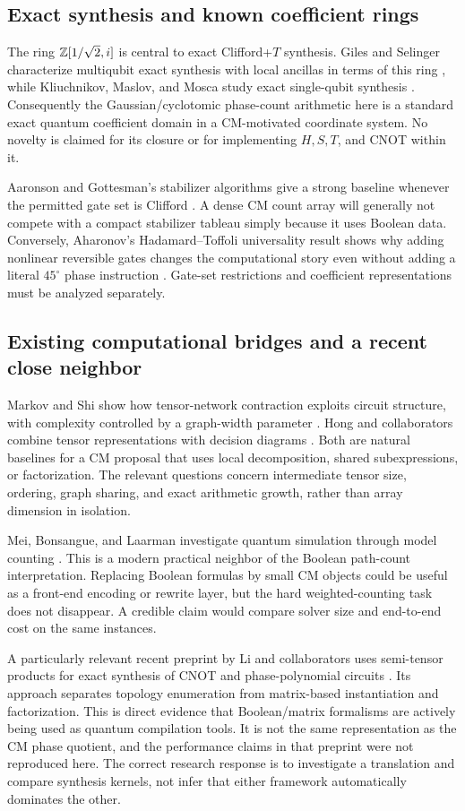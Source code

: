 \subsection{Exact synthesis and known coefficient rings}
The ring $\mathbb Z[1/\sqrt2,i]$ is central to exact Clifford+$T$ synthesis. Giles and Selinger characterize multiqubit exact synthesis with local ancillas in terms of this ring \cite{giles}, while Kliuchnikov, Maslov, and Mosca study exact single-qubit synthesis \cite{kmm}. Consequently the Gaussian/cyclotomic phase-count arithmetic here is a standard exact quantum coefficient domain in a CM-motivated coordinate system. No novelty is claimed for its closure or for implementing $H,S,T$, and CNOT within it.

Aaronson and Gottesman's stabilizer algorithms give a strong baseline whenever the permitted gate set is Clifford \cite{aaronson}. A dense CM count array will generally not compete with a compact stabilizer tableau simply because it uses Boolean data. Conversely, Aharonov's Hadamard--Toffoli universality result shows why adding nonlinear reversible gates changes the computational story even without adding a literal $45^\circ$ phase instruction \cite{aharonov}. Gate-set restrictions and coefficient representations must be analyzed separately.

\subsection{Existing computational bridges and a recent close neighbor}
Markov and Shi show how tensor-network contraction exploits circuit structure, with complexity controlled by a graph-width parameter \cite{markov}. Hong and collaborators combine tensor representations with decision diagrams \cite{tdd}. Both are natural baselines for a CM proposal that uses local decomposition, shared subexpressions, or factorization. The relevant questions concern intermediate tensor size, ordering, graph sharing, and exact arithmetic growth, rather than array dimension in isolation.

Mei, Bonsangue, and Laarman investigate quantum simulation through model counting \cite{mei}. This is a modern practical neighbor of the Boolean path-count interpretation. Replacing Boolean formulas by small CM objects could be useful as a front-end encoding or rewrite layer, but the hard weighted-counting task does not disappear. A credible claim would compare solver size and end-to-end cost on the same instances.

A particularly relevant recent preprint by Li and collaborators uses semi-tensor products for exact synthesis of CNOT and phase-polynomial circuits \cite{stp2026}. Its approach separates topology enumeration from matrix-based instantiation and factorization. This is direct evidence that Boolean/matrix formalisms are actively being used as quantum compilation tools. It is not the same representation as the CM phase quotient, and the performance claims in that preprint were not reproduced here. The correct research response is to investigate a translation and compare synthesis kernels, not infer that either framework automatically dominates the other.

